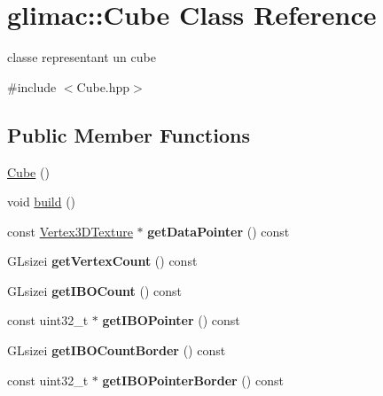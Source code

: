 \hypertarget{classglimac_1_1Cube}{}\section{glimac\+:\+:Cube Class Reference}
\label{classglimac_1_1Cube}


classe representant un cube  




{\ttfamily \#include $<$Cube.\+hpp$>$}

\subsection*{Public Member Functions}
\begin{DoxyCompactItemize}
\item 
\hyperlink{classglimac_1_1Cube_a801f14f22e31defc97297ee0f3409856}{Cube} ()
\item 
void \hyperlink{classglimac_1_1Cube_a90a46da5252a79df816f3289ff5910f3}{build} ()
\item 
\mbox{\label{classglimac_1_1Cube_a29357c655008183dacf647cb3c6fcb12}} 
const \hyperlink{structglimac_1_1Vertex3DTexture}{Vertex3\+D\+Texture} $\ast$ {\bfseries get\+Data\+Pointer} () const
\item 
\mbox{\label{classglimac_1_1Cube_a579f0c59b840981a71c3fb068d290bfc}} 
G\+Lsizei {\bfseries get\+Vertex\+Count} () const
\item 
\mbox{\label{classglimac_1_1Cube_a15f4c706a6958d1e06479c0c1a743b8c}} 
G\+Lsizei {\bfseries get\+I\+B\+O\+Count} () const
\item 
\mbox{\label{classglimac_1_1Cube_a71a64cda0b1ed4f733d9d8132b2866b4}} 
const uint32\+\_\+t $\ast$ {\bfseries get\+I\+B\+O\+Pointer} () const
\item 
\mbox{\label{classglimac_1_1Cube_af5e5d77fd2bd354383d7b448234d5286}} 
G\+Lsizei {\bfseries get\+I\+B\+O\+Count\+Border} () const
\item 
\mbox{\label{classglimac_1_1Cube_a93dd4105228440066a216b95697648ad}} 
const uint32\+\_\+t $\ast$ {\bfseries get\+I\+B\+O\+Pointer\+Border} () const
\item 

\end{DoxyCompactItemize}
